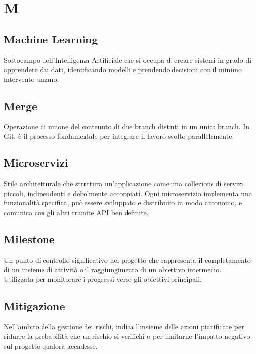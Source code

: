 \documentclass[a4paper, 11pt, oneside]{scrartcl} %
\begin{document}

\section*{M}


\subsection*{Machine Learning}
Sottocampo dell'Intelligenza Artificiale che si occupa di creare sistemi in grado di apprendere dai dati, identificando modelli e prendendo decisioni con il minimo intervento umano.
\vspace{0.5cm}

\subsection*{Merge}
Operazione di unione del contenuto di due branch distinti in un unico branch. In Git, è il processo fondamentale per integrare il lavoro svolto parallelamente.
\vspace{0.5cm}

\subsection*{Microservizi}
Stile architetturale che struttura un'applicazione come una collezione di servizi piccoli, indipendenti e debolmente accoppiati. Ogni microservizio implementa una funzionalità specifica, può essere sviluppato e distribuito in modo autonomo, e comunica con gli altri tramite API ben definite.
\vspace{0.5cm}

\subsection*{Milestone}
Un punto di controllo significativo nel progetto che rappresenta il completamento di un insieme di attività o il raggiungimento di un obiettivo intermedio. Utilizzata per monitorare i progressi verso gli obiettivi principali.
\vspace{0.5cm}

\subsection*{Mitigazione}
Nell'ambito della gestione dei rischi, indica l'insieme delle azioni pianificate per ridurre la probabilità che un rischio si verifichi o per limitarne l'impatto negativo sul progetto qualora accadesse.
\vspace{0.5cm}
\end{document}
